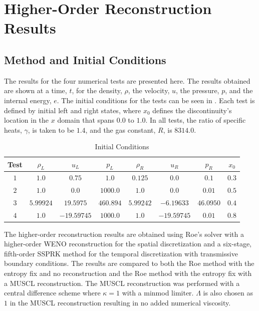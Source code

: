 \chapter{Higher-Order Reconstruction Results}
\label{ch:Results}
\section{Method and Initial Conditions}
The results for the four numerical tests are presented here. The results obtained are shown at a time, $t$, for the density, $\rho$, the velocity, $u$, the pressure, $p$, and the internal energy, $e$. The initial conditions for the tests can be seen in . Each test is defined by initial left and right states, where $x_0$ defines the discontinuity's location in the $x$ domain that spans $0.0$ to $1.0$. In all tests, the ratio of specific heats, $\gamma$, is taken to be $1.4$, and the gas constant, $R$, is $8314.0$.

\begin{table}
	\begin{center}
		\caption{Initial Conditions}
		\label{tbl:testparameters}
		\begin{tabular}{@{}cccccccc@{}}
			\toprule \rule[-1pt]{0pt}{14pt}Test&$\rho_L$&$u_L$&$p_L$&$\rho_R$&$u_R$&$p_R$&$x_0$\\
			\midrule \rule[-1pt]{0pt}{14pt}$1$&$1.0$&$0.75$&$1.0$&$0.125$&$0.0$&$0.1$&$0.3$\\
			\rule[-1pt]{0pt}{14pt}$2$&$1.0$&$0.0$&$1000.0$&$1.0$&$0.0$&$0.01$&$0.5$\\
			\rule[-1pt]{0pt}{14pt}$3$&$5.99924$&$19.5975$&$460.894$&$5.99242$&$-6.19633$&$46.0950$&$0.4$\\
			\rule[-1pt]{0pt}{14pt}$4$&$1.0$&$-19.59745$&$1000.0$&$1.0$&$-19.59745$&$0.01$&$0.8$\\
			
			\bottomrule
		\end{tabular}
	\end{center}
\end{table}

The higher-order reconstruction results are obtained using Roe's solver with a higher-order WENO reconstruction for the spatial discretization and a six-stage, fifth-order SSPRK method for the temporal discretization with transmissive boundary conditions. The results are compared to both the Roe method with the entropy fix and no reconstruction and the Roe method with the entropy fix with a MUSCL reconstruction. The MUSCL reconstruction was performed with a central difference scheme where $\kappa = 1$ with a minmod limiter. $\Lambda$ is also chosen as $1$ in the MUSCL reconstruction resulting in no added numerical viscosity.

